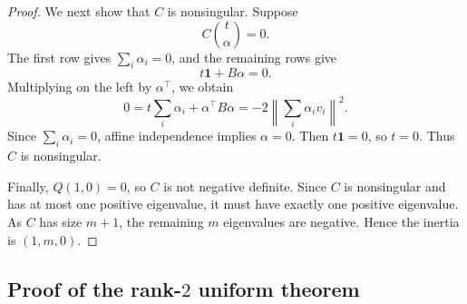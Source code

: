 \documentclass[12pt]{amsart}
\theoremstyle{definition}
\newcommand{\1}{\mathbf{1}}
\newcommand\T{{\mathbb T}}
\newcommand\mb{\texorpdfstring{\textbf{Matt:} }{Matt: }}
\newcommand{\mk}[2][]{\todo[color=orange, #1]{\textbf{Mario}: #2}}
\begin{document}
\begin{proof}
We next show that $C$ is nonsingular.  Suppose
\[
        C\binom{t}{\alpha}=0.
\]
The first row gives $\sum_i\alpha_i=0$, and the remaining rows give
\[
        t\1+B\alpha=0.
\]
Multiplying on the left by $\alpha^\top$, we obtain
\[
        0
        =
        t\sum_i\alpha_i+\alpha^\top B\alpha
        =
        -2\left\|\sum_i\alpha_i v_i\right\|^2.
\]
Since $\sum_i\alpha_i=0$, affine independence implies $\alpha=0$.  Then $t\1=0$, so
$t=0$.  Thus $C$ is nonsingular.

Finally, $Q(1,0)=0$, so $C$ is not negative definite.  Since $C$ is nonsingular and
has at most one positive eigenvalue, it must have exactly one positive eigenvalue.  As
$C$ has size $m+1$, the remaining $m$ eigenvalues are negative.  Hence the inertia
is $(1,m,0)$.
\end{proof}


% 

\subsection{Proof of the rank-\texorpdfstring{$2$}{2} uniform theorem}
\end{document}

